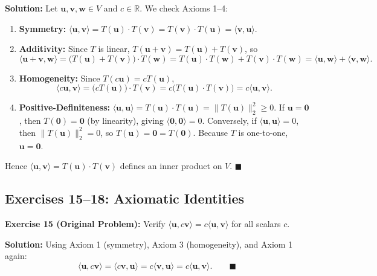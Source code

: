 \documentclass[11pt, letterpaper]{article}
\theoremstyle{definition}
\theoremstyle{remark}
\begin{document}
\textbf{Solution:}
Let $\mathbf{u}, \mathbf{v}, \mathbf{w} \in V$ and $c \in \mathbb{R}$. We check Axioms 1--4:
\begin{enumerate}[label=\textbf{\arabic*.}]
    \item \textbf{Symmetry:} $\langle \mathbf{u}, \mathbf{v} \rangle = T(\mathbf{u}) \cdot T(\mathbf{v}) = T(\mathbf{v}) \cdot T(\mathbf{u}) = \langle \mathbf{v}, \mathbf{u} \rangle$.
    \item \textbf{Additivity:} Since $T$ is linear, $T(\mathbf{u} + \mathbf{v}) = T(\mathbf{u}) + T(\mathbf{v})$, so
    \[
        \langle \mathbf{u} + \mathbf{v}, \mathbf{w} \rangle = \bigl(T(\mathbf{u}) + T(\mathbf{v})\bigr) \cdot T(\mathbf{w}) = T(\mathbf{u}) \cdot T(\mathbf{w}) + T(\mathbf{v}) \cdot T(\mathbf{w}) = \langle \mathbf{u}, \mathbf{w} \rangle + \langle \mathbf{v}, \mathbf{w} \rangle.
    \]
    \item \textbf{Homogeneity:} Since $T(c\mathbf{u}) = cT(\mathbf{u})$,
    \[
        \langle c\mathbf{u}, \mathbf{v} \rangle = \bigl(cT(\mathbf{u})\bigr) \cdot T(\mathbf{v}) = c\bigl(T(\mathbf{u}) \cdot T(\mathbf{v})\bigr) = c\langle \mathbf{u}, \mathbf{v} \rangle.
    \]
    \item \textbf{Positive-Definiteness:} $\langle \mathbf{u}, \mathbf{u} \rangle = T(\mathbf{u}) \cdot T(\mathbf{u}) = \|T(\mathbf{u})\|_2^2 \ge 0$. If $\mathbf{u} = \mathbf{0}$, then $T(\mathbf{0}) = \mathbf{0}$ (by linearity), giving $\langle \mathbf{0}, \mathbf{0} \rangle = 0$. Conversely, if $\langle \mathbf{u}, \mathbf{u} \rangle = 0$, then $\|T(\mathbf{u})\|_2^2 = 0$, so $T(\mathbf{u}) = \mathbf{0} = T(\mathbf{0})$. Because $T$ is one-to-one, $\mathbf{u} = \mathbf{0}$.
\end{enumerate}
Hence $\langle \mathbf{u}, \mathbf{v} \rangle = T(\mathbf{u}) \cdot T(\mathbf{v})$ defines an inner product on $V$. \hfill $\blacksquare$

\subsection{Exercises 15--18: Axiomatic Identities}

\textbf{Exercise 15 (Original Problem):} Verify $\langle \mathbf{u}, c\mathbf{v} \rangle = c\langle \mathbf{u}, \mathbf{v} \rangle$ for all scalars $c$.

\textbf{Solution:}
Using Axiom 1 (symmetry), Axiom 3 (homogeneity), and Axiom 1 again:
\[
    \langle \mathbf{u}, c\mathbf{v} \rangle = \langle c\mathbf{v}, \mathbf{u} \rangle = c\langle \mathbf{v}, \mathbf{u} \rangle = c\langle \mathbf{u}, \mathbf{v} \rangle. \qquad \blacksquare
\]
\end{document}
